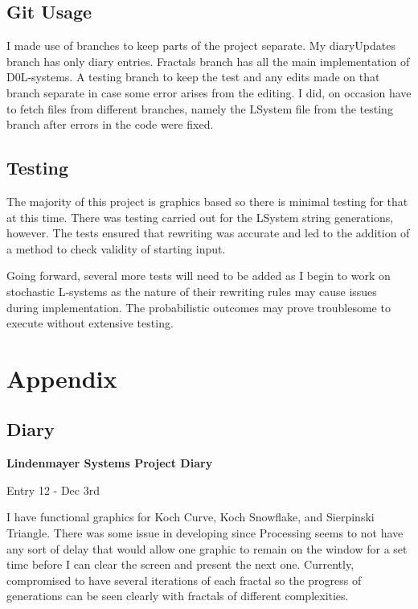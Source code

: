 \documentclass[]{interim_report}
\begin{document}
\section{Git Usage}

I made use of branches to keep parts of the project separate. My diaryUpdates branch has only diary entries. Fractals branch has all the main implementation of D0L-systems. A testing branch to keep the test and any edits made on that branch separate in case some error arises from the editing. I did, on occasion have to fetch files from different branches, namely the LSystem file from the testing branch after errors in the code were fixed. 

\section{Testing}

The majority of this project is graphics based so there is minimal testing for that at this time. There was testing carried out for the LSystem string generations, however. The tests ensured that rewriting was accurate and led to the addition of a method to check validity of starting input. 

Going forward, several more tests will need to be added as I begin to work on stochastic L-systems as the nature of their rewriting rules may cause issues during implementation. The probabilistic outcomes may prove troublesome to execute without extensive testing.

\chapter{Appendix}

\section{Diary}

\textbf{Lindenmayer Systems Project Diary}

Entry 12 - Dec 3rd

I have functional graphics for Koch Curve, Koch Snowflake, and Sierpinski Triangle. There was some issue in developing since Processing seems to not have any sort of delay that would allow one graphic to remain on the window for a set time before I can clear the screen and present the next one. Currently, compromised to have several iterations of each fractal so the progress of generations can be seen clearly with fractals of different complexities.
\end{document}

